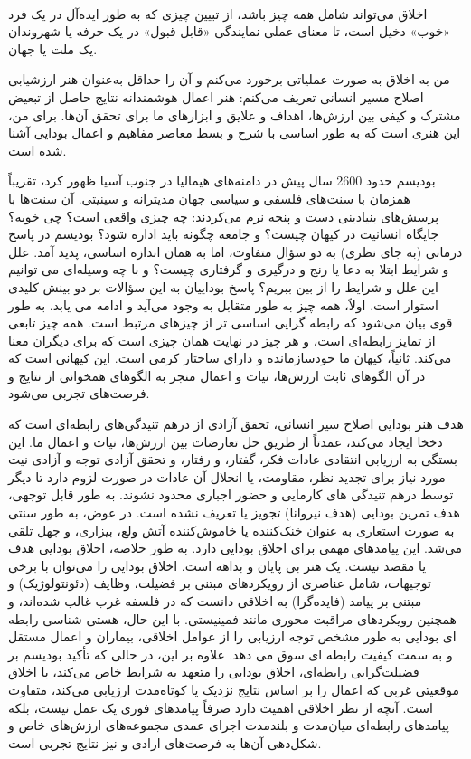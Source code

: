 \paragraph{}
اخلاق می‌تواند شامل همه چیز باشد، از تبیین چیزی که به طور ایده‌آل در یک فرد «خوب» دخیل است، تا معنای عملی نمایندگی «قابل قبول» در یک حرفه یا شهروندان یک ملت یا جهان.

من به اخلاق به صورت عملیاتی برخورد می‌کنم و آن را حداقل به‌عنوان هنر ارزشیابی اصلاح مسیر انسانی تعریف می‌کنم: هنر اعمال هوشمندانه نتایج حاصل از تبعیض مشترک و کیفی بین ارزش‌ها، اهداف و علایق و ابزارهای ما برای تحقق آن‌ها.
برای من، این هنری است که به طور اساسی با شرح و بسط معاصر مفاهیم و اعمال بودایی آشنا شده است.

بودیسم حدود 2600 سال پیش در دامنه‌های هیمالیا در جنوب آسیا ظهور کرد، تقریباً همزمان با سنت‌های فلسفی و سیاسی جهان مدیترانه و سینیتی.
آن سنت‌ها با پرسش‌های بنیادینی دست و پنجه نرم می‌کردند: چه چیزی واقعی است؟ چی خوبه؟ جایگاه انسانیت در کیهان چیست؟ و جامعه چگونه باید اداره شود؟ بودیسم در پاسخ درمانی (به جای نظری) به دو سؤال متفاوت، اما به همان اندازه اساسی، پدید آمد.
علل و شرایط ابتلا به دعا یا رنج و درگیری و گرفتاری چیست؟ و با چه وسیله‌ای می توانیم این علل و شرایط را از بین ببریم؟ پاسخ بوداییان به این سؤالات بر دو بینش کلیدی استوار است.
اولاً، همه چیز به طور متقابل به وجود می‌آید و ادامه می یابد.
به طور قوی بیان می‌شود که رابطه گرایی اساسی تر از چیزهای مرتبط است.
همه چیز تابعی از تمایز رابطه‌ای است، و هر چیز در نهایت همان چیزی است که برای دیگران معنا می‌کند.
ثانیاً، کیهان ما خودسازمانده و دارای ساختار کرمی است.
این کیهانی است که در آن الگوهای ثابت ارزش‌ها، نیات و اعمال منجر به الگوهای همخوانی از نتایج و فرصت‌های تجربی می‌شود.

هدف هنر بودایی اصلاح سیر انسانی، تحقق آزادی از درهم تنیدگی‌های رابطه‌ای است که دخخا ایجاد می‌کند، عمدتاً از طریق حل تعارضات بین ارزش‌ها، نیات و اعمال ما.
این بستگی به ارزیابی انتقادی عادات فکر، گفتار، و رفتار، و تحقق آزادی توجه و آزادی نیت مورد نیاز برای تجدید نظر، مقاومت، یا انحلال آن عادات در صورت لزوم دارد تا دیگر توسط درهم تنیدگی های کارمایی و حضور اجباری محدود نشوند.
به طور قابل توجهی، هدف تمرین بودایی (هدف نیروانا) تجویز یا تعریف نشده است.
در عوض، به طور سنتی به صورت استعاری به عنوان خنک‌کننده یا خاموش‌کننده آتش ولع، بیزاری، و جهل تلقی می‌شد.
این پیامدهای مهمی برای اخلاق بودایی دارد.
به طور خلاصه، اخلاق بودایی هدف یا مقصد نیست.
یک هنر بی پایان و بداهه است.
اخلاق بودایی را می‌توان با برخی توجیهات، شامل عناصری از رویکردهای مبتنی بر فضیلت، وظایف (دئونتولوژیک) و مبتنی بر پیامد (فایده‌گرا) به اخلاقی دانست که در فلسفه غرب غالب شده‌اند، و همچنین رویکردهای مراقبت محوری مانند فمینیستی.
با این حال، هستی شناسی رابطه ای بودایی به طور مشخص توجه ارزیابی را از عوامل اخلاقی، بیماران و اعمال مستقل و به سمت کیفیت رابطه ای سوق می دهد.
علاوه بر این، در حالی که تأکید بودیسم بر فضیلت‌گرایی رابطه‌ای، اخلاق بودایی را متعهد به شرایط خاص می‌کند، با اخلاق موقعیتی غربی که اعمال را بر اساس نتایج نزدیک یا کوتاه‌مدت ارزیابی می‌کند، متفاوت است.
آنچه از نظر اخلاقی اهمیت دارد صرفاً پیامدهای فوری یک عمل نیست، بلکه پیامدهای رابطه‌ای میان‌مدت و بلندمدت اجرای عمدی مجموعه‌های ارزش‌های خاص و شکل‌دهی آن‌ها به فرصت‌های ارادی و نیز نتایج تجربی است.
